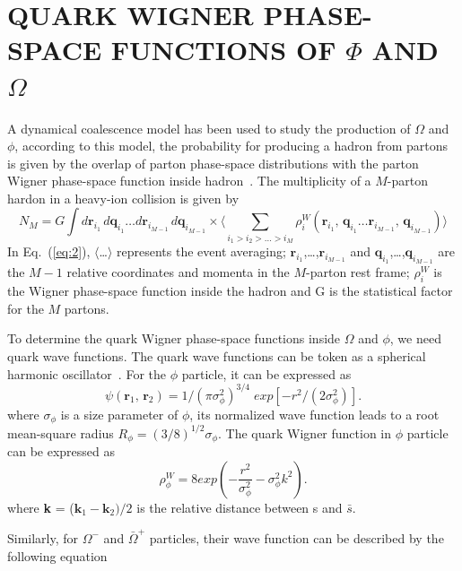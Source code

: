 \documentclass[11pt,a4paper,openany]{article}
\begin{document}
\section{QUARK WIGNER PHASE-SPACE FUNCTIONS OF $\Phi$ AND $\Omega$}
A dynamical coalescence model has been used to study the production of $\Omega$ and $\phi$,
according to this model, the probability for producing a hadron from partons is given by the
overlap of parton phase-space distributions with the parton Wigner phase-space function inside
hadron~\cite{COALESCENCE}. The multiplicity of a $M$-parton hardon in a heavy-ion collision is
given by
\begin{equation}
  \label{eq:2}
  N_{M} = G  \int{}d\bm{r}_{i_{1}}\,d\bm{q}_{i_{1}}\dots{}d\bm{r}_{i_{M-1}}\,d\bm{q}_{i_{M-1}}\times{}\langle{}\sum_{i_{1}>i_{2}>\dots>i_{M}}\rho_{i}^{W}(\bm{r}_{i_{1}},\,\bm{q}_{i_{1}}\dots{}\bm{r}_{i_{M-1}},\,\bm{q}_{i_{M-1}}) \rangle{}
\end{equation}
In Eq.~(\ref{eq:2}), $\langle{}$\dots$\rangle{}$ represents the event averaging; $\textbf{r}_{i_{1}}$,\dots{},$\textbf{r}_{i_{M-1}}$ and
$\textbf{q}_{i_{1}}$,\dots,$\textbf{q}_{i_{M-1}}$ are the $M-1$ relative coordinates and momenta
in the $M$-parton rest frame; $\rho_{i}^{W}$ is the Wigner phase-space function inside the hadron
and G is the statistical factor for the $M$ partons.
\par
To determine the quark Wigner phase-space functions inside $\Omega$ and $\phi$, we need quark
wave functions. The quark wave functions can be token as a spherical harmonic
oscillator~\cite{waveFunction}. For the $\phi$ particle, it can be expressed as
\begin{equation}
  \label{eq:3}
  \psi(\bm{r}_{1},\,\bm{r}_{2}) = 1 / (\pi\sigma_{\phi}^{2})^{3/4}\;exp\left[-r^{2}/(2\sigma_{\phi}^{2})\right].
\end{equation}
where $\sigma_{\phi}$ is a size parameter of $\phi$, its normalized wave function leads to a root
mean-square radius $R_{\phi} = (3/8)^{1/2}\sigma_{\phi}$. The quark Wigner function in $\phi$
particle can be expressed as
\begin{equation}
  \label{eq:4}
  \rho_{\phi}^{W} = 8 exp\left(-\frac{r^2}{\sigma_{\phi}^2}-\sigma_{\phi}^{2}k^{2}\right).
\end{equation}
where \textbf{k} = ($\textbf{k}_{1}-\textbf{k}_{2})/2$ is the relative distance between s and
$\bar{s}$.
\par
Similarly, for $\Omega^{-}$ and $\bar{\Omega}^{+}$ particles, their wave function can be described
by the following equation
\end{document}
